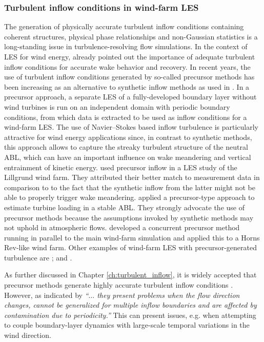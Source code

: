 \subsubsection{Turbulent inflow conditions in wind-farm LES}
The generation of physically accurate turbulent inflow conditions containing coherent structures, physical phase relationships and non-Gaussian statistics is a long-standing issue in turbulence-resolving flow simulations. In the context of LES for wind energy, \cite{troldborg2007actuator} already pointed out the importance of adequate turbulent inflow conditions for accurate wake behavior and recovery. In recent years, the use of turbulent inflow conditions generated by so-called precursor methods has been increasing \citep{keating2004priori, tabor2010inlet} as an alternative to synthetic inflow methods as used in \cite{ivanell2009numerical}. In a precursor approach, a separate LES of a fully-developed boundary layer without wind turbines is run on an independent domain with periodic boundary conditions, from which data is extracted to be used as inflow conditions for a wind-farm LES. The use of Navier--Stokes based inflow turbulence is particularly attractive for wind energy applications since, in contrast to synthetic methods, this approach allows to capture the streaky turbulent structure of the neutral ABL, which can have an important influence on wake meandering and vertical entrainment of kinetic energy. \cite{churchfield2012large} used precursor inflow in a LES study of the Lillgrund wind farm. They attributed their better match to measurement data in comparison to \cite{ivanell2009numerical} to the fact that the synthetic inflow from the latter might not be able to properly trigger wake meandering. 
\cite{park2014large} applied a precursor-type approach to estimate turbine loading in a stable ABL. They strongly advocate the use of precursor methods because the assumptions invoked by synthetic methods may not uphold in atmospheric flows. \cite{stevens2014concurrent} developed a concurrent precursor method running in parallel to the main wind-farm simulation and applied this to a Horns Rev-like wind farm. Other examples of wind-farm LES with precursor-generated turbulence are \cite{porte2011large,archer2013quantifying,wu2013simulation,stevens2014large,abkar2016wake}; and \cite{stevens2016dependence}.

As further discussed in Chapter \ref{ch:turbulent_inflow}, it is widely accepted that precursor methods generate highly accurate turbulent inflow conditions \citep{keating2004priori,tabor2010inlet,wu2017inflow}. However, as indicated by \cite{esparza2014bridging} \emph{``$\dots$ they present problems when the flow direction changes, cannot be generalized for multiple inflow boundaries and are affected by contamination due to periodicity.''} This can present issues, e.g. when attempting to couple boundary-layer dynamics with large-scale temporal variations in the wind direction. 


